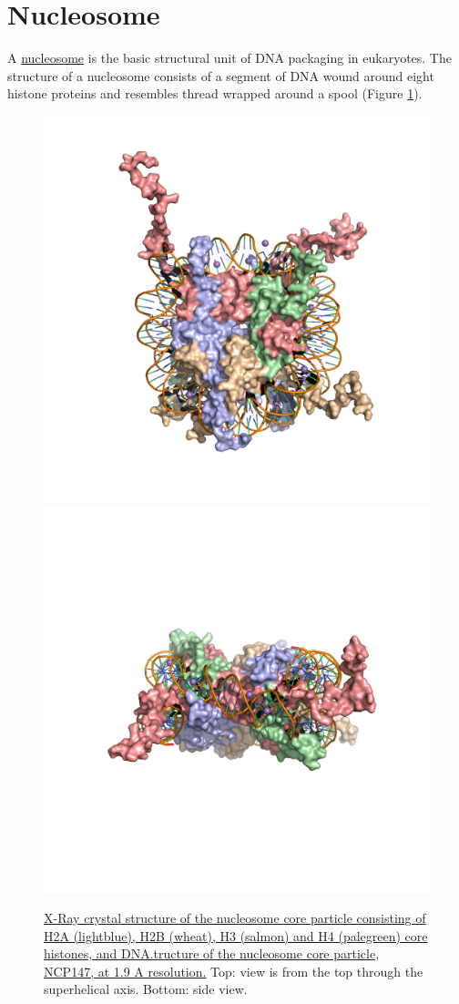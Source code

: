 \hypertarget{nucleosome}{%
\section{Nucleosome}\label{nucleosome}}

A \href{https://en.wikipedia.org/wiki/Nucleosome}{nucleosome} is the basic structural unit of DNA packaging in eukaryotes. The structure of a nucleosome consists of a segment of DNA wound around eight histone proteins and resembles thread wrapped around a spool (Figure \ref{fig:nucleosome}).



\begin{figure}

{\centering \includegraphics[width=0.7\linewidth]{./figures/dna/nucleosome_top} \includegraphics[width=0.7\linewidth]{./figures/dna/nucleosome_side} 

}

\caption{\href{https://www.rcsb.org/structure/1KX5}{X-Ray crystal structure of the nucleosome core particle consisting of H2A (lightblue), H2B (wheat), H3 (salmon) and H4 (palegreen) core histones, and DNA.tructure of the nucleosome core particle, NCP147, at 1.9 A resolution.} Top: view is from the top through the superhelical axis. Bottom: side view.}\label{fig:nucleosome}
\end{figure}

